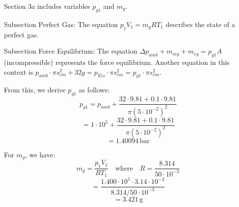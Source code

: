 Section 3a includes variables \( p_{g1} \) and \( m_g \).

Subsection Perfect Gas:
The equation \( p_1 V_1 = m_g R T_1 \) describes the state of a perfect gas.

Subsection Force Equilibrium:
The equation \( \Delta p_{amb} + m_{mg} + m_{eg} = p_{g1} A \) (incompressible) represents the force equilibrium.
Another equation in this context is \( p_{amb} \cdot \pi s_{cm}^2 + 32 g = p_{Eis} \cdot \pi s_{cm}^2 = p_{g1} \cdot \pi s_{cm}^2 \).

From this, we derive \( p_{g1} \) as follows:
\[
p_{g1} = p_{amb} + \frac{32 \cdot 9.81 + 0.1 \cdot 9.81}{\pi (5 \cdot 10^{-2})^2}
\]
\[
= 1 \cdot 10^5 + \frac{32 \cdot 9.81 + 0.1 \cdot 9.81}{\pi (5 \cdot 10^{-2})^2}
\]
\[
= 1.40094 \, \text{bar}
\]

For \( m_g \), we have:
\[
m_g = \frac{p_1 V_1}{R T_1} \quad \text{where} \quad R = \frac{8.314}{50 \cdot 10^{-3}}
\]
\[
= \frac{1.400 \cdot 10^5 \cdot 3.14 \cdot 10^{-3}}{8.314 / 50 \cdot 10^{-3}}
\]
\[
= 3.421 \, \text{g}
\]